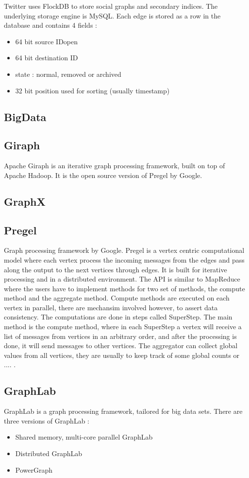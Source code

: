 \documentclass[english]{tktltiki}
\begin{document}
Twitter uses FlockDB to store social graphs and secondary indices. The underlying storage engine is MySQL. Each edge is stored as a row in the database and contains 4 fields :
\begin{itemize}
\item
64 bit source IDopen	
\item
64 bit destination ID
\item
state : normal, removed or archived
\item
32 bit position used for sorting (usually timestamp)
\end{itemize}

\subsection{BigData} 
\subsection{Giraph}
Apache Giraph is an iterative graph processing framework, built on top of Apache Hadoop. It is the open source version of Pregel by Google. 
\subsection{GraphX}
\subsection{Pregel}
Graph processing framework by Google. Pregel is a vertex centric computational model where each vertex process the incoming messages from the edges and pass along the output to the next vertices through edges. It is built for iterative processing and in a distributed environment. The API is similar to MapReduce where the users have to implement methods for two set of methods, the compute method and the aggregate method. Compute methods are executed on each vertex in parallel, there are mechansim involved however, to assert data consistency. The computations are done in steps called SuperStep. The main method is the compute method, where in each SuperStep a vertex will receive a list of messages from vertices in an arbitrary order, and after the processing is done, it will send messages to other vertices. The aggregator can collect global values from all vertices, they are usually  to keep track of some global counts or .... . 
\subsection{GraphLab}
GraphLab is a graph processing framework, tailored for big data sets. There are three versions of GraphLab :
\begin{itemize}
\item
Shared memory, multi-core parallel GraphLab
\item
Distributed GraphLab
\item
PowerGraph

\end{itemize}
\end{document}
